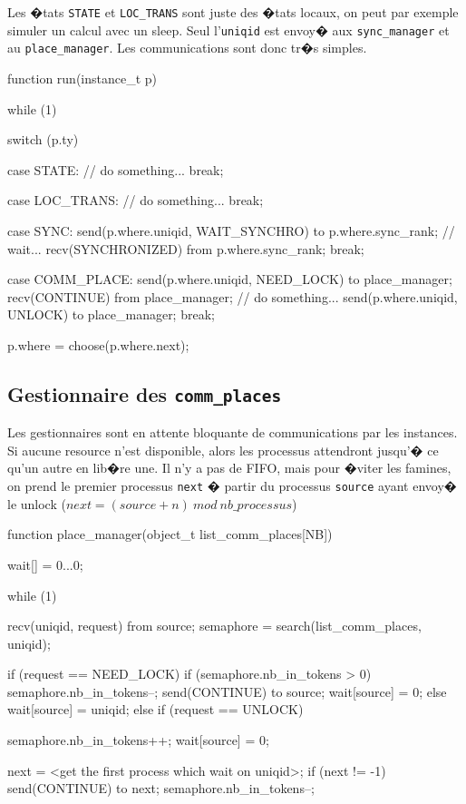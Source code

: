 \documentclass[10pt,a4paper]{article}
\begin{document}
Les �tats {\tt STATE} et {\tt LOC\_TRANS} sont juste des �tats locaux, on
peut par exemple simuler un calcul avec un sleep. Seul l'{\tt uniqid} est
envoy� aux {\tt sync\_manager} et au {\tt place\_manager}. Les communications
sont donc tr�s simples.

\begin{codec}
function run(instance_t p) {
  while (1) {
    switch (p.ty) {
      case STATE:
        // do something...
        break;

      case LOC_TRANS:
        // do something...
        break;

      case SYNC:
        send(p.where.uniqid, WAIT_SYNCHRO) to p.where.sync_rank;
        // wait...
        recv(SYNCHRONIZED) from p.where.sync_rank;
        break;

      case COMM_PLACE:
        send(p.where.uniqid, NEED_LOCK) to place_manager;
        recv(CONTINUE) from place_manager;
        // do something...
        send(p.where.uniqid, UNLOCK) to place_manager;
        break;
    }

    p.where = choose(p.where.next);
  }
}
\end{codec}


\subsection{Gestionnaire des {\tt comm\_places}}

Les gestionnaires sont en attente bloquante de communications par les
instances. Si aucune resource n'est disponible, alors les processus
attendront jusqu'� ce qu'un autre en lib�re une. Il n'y a pas de FIFO,
mais pour �viter les famines, on prend le premier processus {\tt next}
� partir du processus {\tt source} ayant envoy� le unlock 
($next = (source + n ) ~ mod ~ nb\_processus $)

\begin{codec}
function place_manager(object_t list_comm_places[NB]) {
  wait[] = {0...0};

  while (1) {
    recv(uniqid, request) from source;
    semaphore = search(list_comm_places, uniqid);

    if (request == NEED_LOCK) {
      if (semaphore.nb_in_tokens > 0) {
        semaphore.nb_in_tokens--;
        send(CONTINUE) to source;
        wait[source] = 0;
      }
      else {
        wait[source] = uniqid;
      }
    } 
    else if (request == UNLOCK) {
      semaphore.nb_in_tokens++;
      wait[source] = 0;

      next = <get the first process which wait on uniqid>;
      if (next != -1) {
        send(CONTINUE) to next;
        semaphore.nb_in_tokens--;
      }
    }
  }
}
\end{codec}
\end{document}
